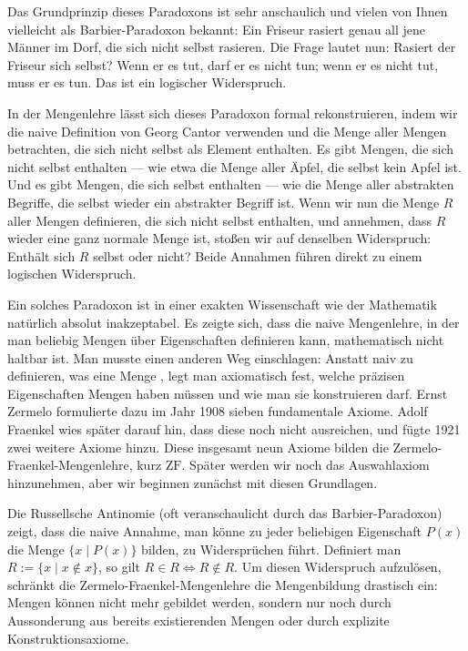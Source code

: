 \begin{spoken-clean}[01:12:50 - 01:15:50]
Das Grundprinzip dieses Paradoxons ist sehr anschaulich und vielen von Ihnen vielleicht als Barbier-Paradoxon bekannt: Ein Friseur rasiert genau all jene Männer im Dorf, die sich nicht selbst rasieren. Die Frage lautet nun: Rasiert der Friseur sich selbst? Wenn er es tut, darf er es nicht tun; wenn er es nicht tut, muss er es tun. Das ist ein logischer Widerspruch.

In der Mengenlehre lässt sich dieses Paradoxon formal rekonstruieren, indem wir die naive Definition von Georg Cantor verwenden und die Menge aller Mengen betrachten, die sich nicht selbst als Element enthalten. Es gibt Mengen, die sich nicht selbst enthalten --- wie etwa die Menge aller Äpfel, die selbst kein Apfel ist. Und es gibt Mengen, die sich selbst enthalten --- wie die Menge aller abstrakten Begriffe, die selbst wieder ein abstrakter Begriff ist. Wenn wir nun die Menge $R$ aller Mengen definieren, die sich nicht selbst enthalten, und annehmen, dass $R$ wieder eine ganz normale Menge ist, stoßen wir auf denselben Widerspruch: Enthält sich $R$ selbst oder nicht? Beide Annahmen führen direkt zu einem logischen Widerspruch.

Ein solches Paradoxon ist in einer exakten Wissenschaft wie der Mathematik natürlich absolut inakzeptabel. Es zeigte sich, dass die naive Mengenlehre, in der man beliebig Mengen über Eigenschaften definieren kann, mathematisch nicht haltbar ist. Man musste einen anderen Weg einschlagen: Anstatt naiv zu definieren, was eine Menge , legt man axiomatisch fest, welche präzisen Eigenschaften Mengen haben müssen und wie man sie konstruieren darf. Ernst Zermelo formulierte dazu im Jahr 1908 sieben fundamentale Axiome. Adolf Fraenkel wies später darauf hin, dass diese noch nicht ausreichen, und fügte 1921 zwei weitere Axiome hinzu. Diese insgesamt neun Axiome bilden die Zermelo-Fraenkel-Mengenlehre, kurz $\text{ZF}$. Später werden wir noch das Auswahlaxiom hinzunehmen, aber wir beginnen zunächst mit diesen Grundlagen.
\end{spoken-clean}

\begin{didactic-insight}
Die Russellsche Antinomie (oft veranschaulicht durch das Barbier-Paradoxon) zeigt, dass die naive Annahme, man könne zu jeder beliebigen Eigenschaft $P(x)$ die Menge $\{x \mid P(x)\}$ bilden, zu Widersprüchen führt. Definiert man $R := \{x \mid x \notin x\}$, so gilt $R \in R \iff R \notin R$. Um diesen Widerspruch aufzulösen, schränkt die Zermelo-Fraenkel-Mengenlehre die Mengenbildung drastisch ein: Mengen können nicht mehr  gebildet werden, sondern nur noch durch Aussonderung aus bereits existierenden Mengen oder durch explizite Konstruktionsaxiome.
\end{didactic-insight}

